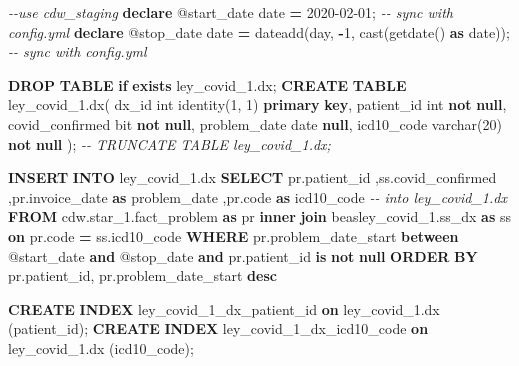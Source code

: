\documentclass[
]{book}
\newenvironment{Shaded}{\begin{snugshade}}{\end{snugshade}}
\newcommand{\CommentTok}[1]{\textcolor[rgb]{0.56,0.35,0.01}{\textit{#1}}}
\newcommand{\ControlFlowTok}[1]{\textcolor[rgb]{0.13,0.29,0.53}{\textbf{#1}}}
\newcommand{\DataTypeTok}[1]{\textcolor[rgb]{0.13,0.29,0.53}{#1}}
\newcommand{\DecValTok}[1]{\textcolor[rgb]{0.00,0.00,0.81}{#1}}
\newcommand{\FunctionTok}[1]{\textcolor[rgb]{0.00,0.00,0.00}{#1}}
\newcommand{\KeywordTok}[1]{\textcolor[rgb]{0.13,0.29,0.53}{\textbf{#1}}}
\newcommand{\NormalTok}[1]{#1}
\newcommand{\OperatorTok}[1]{\textcolor[rgb]{0.81,0.36,0.00}{\textbf{#1}}}
\newcommand{\StringTok}[1]{\textcolor[rgb]{0.31,0.60,0.02}{#1}}
\begin{document}
\begin{Shaded}
\begin{Highlighting}[]
\CommentTok{{-}{-}use cdw\_staging}
\KeywordTok{declare}\NormalTok{ @start\_date }\DataTypeTok{date} \OperatorTok{=} \StringTok{\textquotesingle{}2020{-}02{-}01\textquotesingle{}}\NormalTok{;                               }\CommentTok{{-}{-} sync with config.yml}
\KeywordTok{declare}\NormalTok{ @stop\_date  }\DataTypeTok{date} \OperatorTok{=}\NormalTok{ dateadd(}\DataTypeTok{day}\NormalTok{, }\OperatorTok{{-}}\DecValTok{1}\NormalTok{, }\FunctionTok{cast}\NormalTok{(getdate() }\KeywordTok{as} \DataTypeTok{date}\NormalTok{));  }\CommentTok{{-}{-} sync with config.yml}

\KeywordTok{DROP} \KeywordTok{TABLE} \ControlFlowTok{if} \KeywordTok{exists}\NormalTok{ ley\_covid\_1.dx;}
\KeywordTok{CREATE} \KeywordTok{TABLE}\NormalTok{ ley\_covid\_1.dx(}
\NormalTok{  dx\_id           }\DataTypeTok{int}\NormalTok{ identity(}\DecValTok{1}\NormalTok{, }\DecValTok{1}\NormalTok{) }\KeywordTok{primary} \KeywordTok{key}\NormalTok{,}
\NormalTok{  patient\_id      }\DataTypeTok{int}         \KeywordTok{not} \KeywordTok{null}\NormalTok{,}
\NormalTok{  covid\_confirmed bit         }\KeywordTok{not} \KeywordTok{null}\NormalTok{,}
\NormalTok{  problem\_date    }\DataTypeTok{date}            \KeywordTok{null}\NormalTok{,}
\NormalTok{  icd10\_code      }\DataTypeTok{varchar}\NormalTok{(}\DecValTok{20}\NormalTok{) }\KeywordTok{not} \KeywordTok{null}
\NormalTok{);}
\CommentTok{{-}{-} TRUNCATE TABLE ley\_covid\_1.dx;}

\KeywordTok{INSERT} \KeywordTok{INTO}\NormalTok{ ley\_covid\_1.dx}
\KeywordTok{SELECT}
\NormalTok{  pr.patient\_id}
\NormalTok{  ,ss.covid\_confirmed}
\NormalTok{  ,pr.invoice\_date     }\KeywordTok{as}\NormalTok{ problem\_date}
\NormalTok{  ,pr.code             }\KeywordTok{as}\NormalTok{ icd10\_code}
  \CommentTok{{-}{-} into ley\_covid\_1.dx}
\KeywordTok{FROM}\NormalTok{ cdw.star\_1.fact\_problem       }\KeywordTok{as}\NormalTok{ pr}
  \KeywordTok{inner} \KeywordTok{join}\NormalTok{ beasley\_covid\_1.ss\_dx }\KeywordTok{as}\NormalTok{ ss }\KeywordTok{on}\NormalTok{ pr.code }\OperatorTok{=}\NormalTok{ ss.icd10\_code}
\KeywordTok{WHERE}
\NormalTok{  pr.problem\_date\_start }\KeywordTok{between}\NormalTok{ @start\_date }\KeywordTok{and}\NormalTok{ @stop\_date}
  \KeywordTok{and}
\NormalTok{  pr.patient\_id }\KeywordTok{is} \KeywordTok{not} \KeywordTok{null}
\KeywordTok{ORDER} \KeywordTok{BY}\NormalTok{ pr.patient\_id, pr.problem\_date\_start }\KeywordTok{desc}

\KeywordTok{CREATE} \KeywordTok{INDEX}\NormalTok{ ley\_covid\_1\_dx\_patient\_id }\KeywordTok{on}\NormalTok{ ley\_covid\_1.dx (patient\_id);}
\KeywordTok{CREATE} \KeywordTok{INDEX}\NormalTok{ ley\_covid\_1\_dx\_icd10\_code }\KeywordTok{on}\NormalTok{ ley\_covid\_1.dx (icd10\_code);}
\end{Highlighting}
\end{Shaded}
\end{document}
